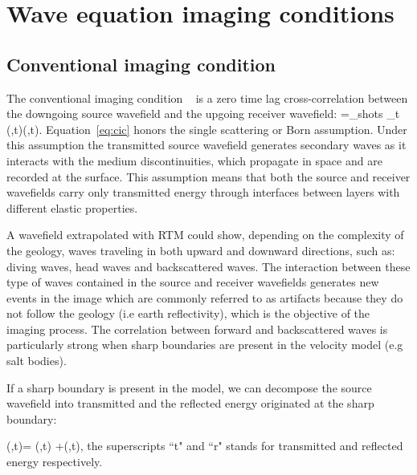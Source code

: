 \section{Wave equation imaging conditions}




\subsection{Conventional imaging condition}
The conventional imaging condition ~\citep{Claerbout:1985:IEI:3887}
is a zero time lag cross-correlation between the downgoing source wavefield and the upgoing 
receiver wavefield:
%
\beq
\R=\sum_{shots} \sum_{t} \US(\xx,t)\UR(\xx,t).
\label{eq:cic}
\eeq
%
 Equation~\ref{eq:cic} honors the single scattering or Born assumption. Under this assumption the transmitted
source wavefield generates secondary waves as it interacts with the medium discontinuities, which propagate in 
space and are recorded at the surface. This assumption means that both the source and receiver
wavefields carry only transmitted energy through interfaces between layers with different elastic properties.

A wavefield extrapolated with RTM could show, depending on the complexity of the geology, waves traveling in both
upward and downward directions, such as: diving waves, head waves and backscattered waves. The interaction between
 these type of waves contained in the source and receiver wavefields generates new events in the image which are 
commonly referred to as artifacts because they do not follow the geology (i.e earth reflectivity), which is the objective 
of the imaging process. The correlation between forward and backscattered waves is particularly strong when
sharp boundaries are present in the velocity model (e.g salt bodies).

If a sharp boundary is present in the model, we can decompose the source wavefield into transmitted 
 and the reflected energy originated at the sharp boundary:

\beq
\US(\xx,t)= \USr(\xx,t) +\USt(\xx,t),
\label{eq:ssplit}
\eeq
%
the superscripts ``t" and ``r" stands for transmitted and reflected energy respectively. 

